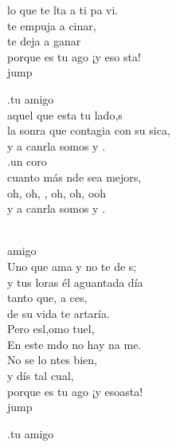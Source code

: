 \begin{cancion}[Es tu amigo es][Kairoi]
	lo que te lta a ti pa vi. \\
	te empuja a cinar, \\
	te deja a ganar\\
	porque es tu ago ¡y eso sta!\\jump\\
	\begin{chorus}%
	.tu amigo  \\
	aquel que esta tu lado,s \\
	la sonra que contagia con su sica,\\
	y a canrla somos  y .\\
	.un coro  \\
	cuanto más nde sea mejors, \\
	oh, oh, , oh, oh,  ooh \\
	y a canrla somos  y .  \\
	\end{chorus}%
	\jump\\
	  amigo  \\
	Uno que  ama y no te de s;\\
	y tus loras él aguantada día \\
	tanto que, a ces,\\
	de su vida te artaría. \\
	Pero esl,omo tuel, \\
	En este mdo no hay na me.\\
	No se lo ntes bien,\\
	y dís tal cual,\\
	porque es tu ago ¡y esoasta!\\jump\\
	\begin{chorus}%
	.tu amigo  \\

\end{chorus}
\end{cancion}
